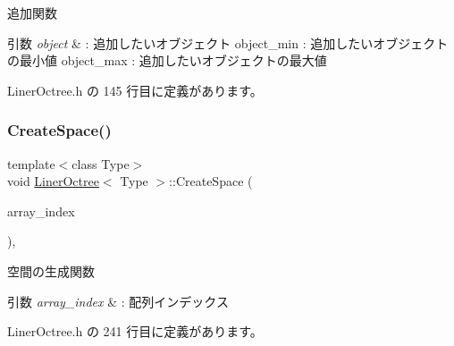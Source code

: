 追加関数 


\begin{DoxyParams}{引数}
{\em object} & \+: 追加したいオブジェクト object\+\_\+min \+: 追加したいオブジェクトの最小値 object\+\_\+max \+: 追加したいオブジェクトの最大値 \\
\hline
\end{DoxyParams}


 Liner\+Octree.\+h の 145 行目に定義があります。

\mbox{\label{class_liner_octree_a62aa42a787a399c3651bac3bbef8f1a6}} 
\subsubsection{\texorpdfstring{Create\+Space()}{CreateSpace()}}
{\footnotesize\ttfamily template$<$class Type$>$ \\
void \mbox{\hyperlink{class_liner_octree}{Liner\+Octree}}$<$ Type $>$\+::Create\+Space (\begin{DoxyParamCaption}\item[{D\+W\+O\+RD}]{array\+\_\+index }\end{DoxyParamCaption})\hspace{0.3cm}{\ttfamily [inline]}, {\ttfamily [private]}}



空間の生成関数 


\begin{DoxyParams}{引数}
{\em array\+\_\+index} & \+: 配列インデックス \\
\hline
\end{DoxyParams}


 Liner\+Octree.\+h の 241 行目に定義があります。

\mbox{\label{class_liner_octree_a4d7c6e47990d16ed28e3ab89443c1af4}} 
